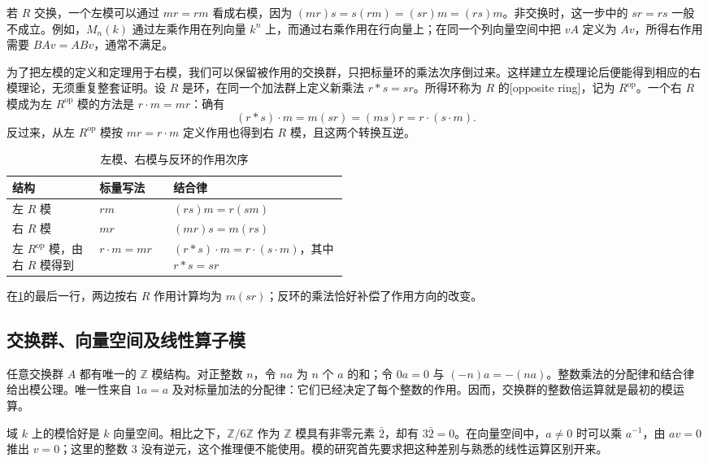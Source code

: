 若 \(R\) 交换，一个左模可以通过 \(mr=rm\) 看成右模，因为 \((mr)s=s(rm)=(sr)m=(rs)m\)。非交换时，这一步中的 \(sr=rs\) 一般不成立。例如，\(M_n(k)\) 通过左乘作用在列向量 \(k^n\) 上，而通过右乘作用在行向量上；在同一个列向量空间中把 \(vA\) 定义为 \(Av\)，所得右作用需要 \(BA v=AB v\)，通常不满足。

\ProseParagraphBreak
为了把左模的定义和定理用于右模，我们可以保留被作用的交换群，只把标量环的乘法次序倒过来。这样建立左模理论后便能得到相应的右模理论，无须重复整套证明。设 \(R\) 是环，在同一个加法群上定义新乘法 \(r*s=sr\)。所得环称为 \(R\) 的[opposite ring]，记为 \(R^{\mathrm{op}}\)。一个右 \(R\) 模成为左 \(R^{\mathrm{op}}\) 模的方法是 \(r\cdot m=mr\)：确有
\[
	(r*s)\cdot m=m(sr)=(ms)r=r\cdot(s\cdot m).
\]
反过来，从左 \(R^{\mathrm{op}}\) 模按 \(mr=r\cdot m\) 定义作用也得到右 \(R\) 模，且这两个转换互逆。

\begin{table}[htbp]
	\centering
	\caption{左模、右模与反环的作用次序}\label{b2:tab:module-sides}
	\begin{tabularx}{\linewidth}{@{}p{0.26\linewidth}p{0.22\linewidth}X@{}}
		\toprule
		结构 & 标量写法 & 结合律 \\
		\midrule
		左 \(R\) 模 & \(rm\) & \((rs)m=r(sm)\) \\
		右 \(R\) 模 & \(mr\) & \((mr)s=m(rs)\) \\
		左 \(R^{\mathrm{op}}\) 模，由右 \(R\) 模得到 & \(r\cdot m=mr\) & \((r*s)\cdot m=r\cdot(s\cdot m)\)，其中 \(r*s=sr\) \\
		\bottomrule
	\end{tabularx}
\end{table}
在\cref{b2:tab:module-sides}的最后一行，两边按右 \(R\) 作用计算均为 \(m(sr)\)；反环的乘法恰好补偿了作用方向的改变。

\subsection{交换群、向量空间及线性算子模}
\label{b2:subsec:0201:02}

任意交换群 \(A\) 都有唯一的 \(\mathbb Z\) 模结构。对正整数 \(n\)，令 \(na\) 为 \(n\) 个 \(a\) 的和；令 \(0a=0\) 与 \((-n)a=-(na)\)。整数乘法的分配律和结合律给出模公理。唯一性来自 \(1a=a\) 及对标量加法的分配律：它们已经决定了每个整数的作用。因而，交换群的整数倍运算就是最初的模运算。

\ProseParagraphBreak
域 \(k\) 上的模恰好是 \(k\) 向量空间。相比之下，\(\mathbb Z/6\mathbb Z\) 作为 \(\mathbb Z\) 模具有非零元素 \(\bar2\)，却有 \(3\bar2=0\)。在向量空间中，\(a\ne0\) 时可以乘 \(a^{-1}\)，由 \(av=0\) 推出 \(v=0\)；这里的整数 \(3\) 没有逆元，这个推理便不能使用。模的研究首先要求把这种差别与熟悉的线性运算区别开来。

